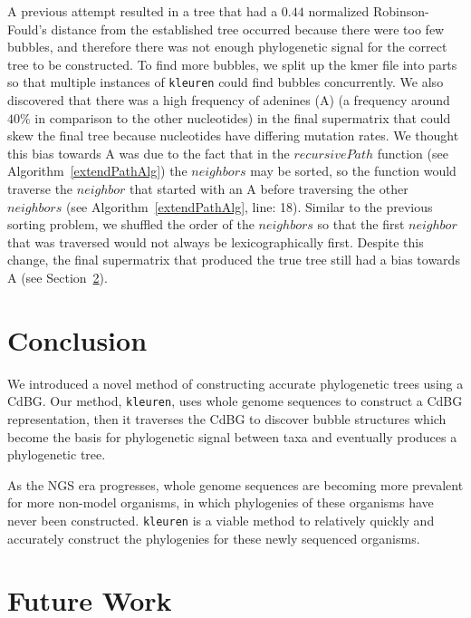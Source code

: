 \documentclass[hidelinks, 10pt, conference, compsocconf]{IEEEtran}
\begin{document}
A previous attempt resulted in a tree that had a $0.44$ normalized Robinson-Fould's distance from the established tree occurred because there were too few bubbles, and therefore there was not enough phylogenetic signal for the correct tree to be constructed.
To find more bubbles, we split up the kmer file into parts so that multiple instances of \texttt{kleuren} could find bubbles concurrently.
We also discovered that there was a high frequency of adenines (A) (a frequency around $40\%$ in comparison to the other nucleotides) in the final supermatrix that could skew the final tree because nucleotides have differing mutation rates.
We thought this bias towards A was due to the fact that in the $recursivePath$ function (see Algorithm~\ref{extendPathAlg}) the $neighbors$ may be sorted, so the function would traverse the $neighbor$ that started with an A before traversing the other $neighbors$ (see Algorithm~\ref{extendPathAlg}, line: 18).
Similar to the previous sorting problem, we shuffled the order of the $neighbors$ so that the first $neighbor$ that was traversed would not always be lexicographically first.
Despite this change, the final supermatrix that produced the true tree still had a bias towards A (see Section~\ref{futureWork}).

\section{Conclusion}

We introduced a novel method of constructing accurate phylogenetic trees using a CdBG.
Our method, \texttt{kleuren}, uses whole genome sequences to construct a CdBG representation, then it traverses the CdBG to discover bubble structures which become the basis for phylogenetic signal between taxa and eventually produces a phylogenetic tree.

As the NGS era progresses, whole genome sequences are becoming more prevalent for more non-model organisms, in which phylogenies of these organisms have never been constructed.
\texttt{kleuren} is a viable method to relatively quickly and accurately construct the phylogenies for these newly sequenced organisms.


\section{Future Work} \label{futureWork}
\end{document}
